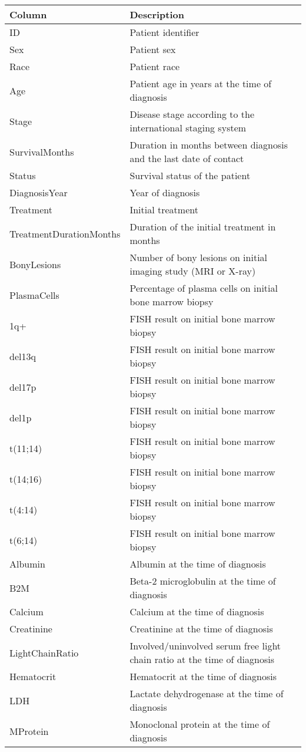 \documentclass[]{book}
\theoremstyle{definition}
\theoremstyle{definition}
\theoremstyle{definition}
\theoremstyle{remark}
\begin{document}
\begin{tabular}{l|l}
\hline
Column & Description\\
\hline
ID & Patient identifier\\
\hline
Sex & Patient sex\\
\hline
Race & Patient race\\
\hline
Age & Patient age in years at the time of diagnosis\\
\hline
Stage & Disease stage according to the international staging system\\
\hline
SurvivalMonths & Duration in months between diagnosis and the last date of contact\\
\hline
Status & Survival status of the patient\\
\hline
DiagnosisYear & Year of diagnosis\\
\hline
Treatment & Initial treatment\\
\hline
TreatmentDurationMonths & Duration of the initial treatment in months\\
\hline
BonyLesions & Number of bony lesions on initial imaging study (MRI or X-ray)\\
\hline
PlasmaCells & Percentage of plasma cells on initial bone marrow biopsy\\
\hline
1q+ & FISH result on initial bone marrow biopsy\\
\hline
del13q & FISH result on initial bone marrow biopsy\\
\hline
del17p & FISH result on initial bone marrow biopsy\\
\hline
del1p & FISH result on initial bone marrow biopsy\\
\hline
t(11;14) & FISH result on initial bone marrow biopsy\\
\hline
t(14;16) & FISH result on initial bone marrow biopsy\\
\hline
t(4:14) & FISH result on initial bone marrow biopsy\\
\hline
t(6;14) & FISH result on initial bone marrow biopsy\\
\hline
Albumin & Albumin  at the time of diagnosis\\
\hline
B2M & Beta-2 microglobulin at the time of diagnosis\\
\hline
Calcium & Calcium at the time of diagnosis\\
\hline
Creatinine & Creatinine at the time of diagnosis\\
\hline
LightChainRatio & Involved/uninvolved serum free light chain ratio at the time of diagnosis\\
\hline
Hematocrit & Hematocrit at the time of diagnosis\\
\hline
LDH & Lactate dehydrogenase at the time of diagnosis\\
\hline
MProtein & Monoclonal protein at the time of diagnosis\\
\hline
\end{tabular}
\end{document}
